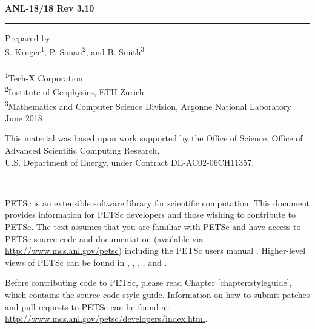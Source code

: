 \hfill {\large {\bf ANL-18/18 Rev 3.10}}

\vspace*{2in}
\vspace*{8pt}
\hrule
\vspace*{8pt}

\vspace*{0.5in}
\noindent Prepared by \\
{S. Kruger\textsuperscript{1}, P. Sanan\textsuperscript{2}, and B. Smith\textsuperscript{3}}\\
\\
\textsuperscript{1}Tech-X Corporation \\
\textsuperscript{2}Institute of Geophysics, ETH Zurich\\
\textsuperscript{3}Mathematics and Computer Science Division, Argonne National Laboratory \\

\vspace*{30pt}
\noindent June 2018

\vspace*{20pt}
\noindent This material was based upon work supported by the Office of Science, Office of Advanced Scientific Computing Research, \\
U.S. Department of Energy, under Contract DE-AC02-06CH11357.


\newpage

\hbox{ }

\vspace{1in}
\date{\today}

\pagestyle{empty}
\newpage

\medskip \medskip

%
%

\medskip \medskip
PETSc is an extensible software library for scientific
computation. This document provides information for PETSc
developers and those wishing to contribute to PETSc. The text assumes
that you are familiar with PETSc and have access to PETSc source code
and documentation (available
via \href{http://www.mcs.anl.gov/petsc}{http://www.mcs.anl.gov/petsc}) including the PETSc users manual \cite{petsc-user-ref}.
Higher-level views of PETSc can be found in \cite{s2011}, \cite{bgms00}, \cite{miss-paper}, \cite{bgms98}, and \cite{petsc-efficient}. 

Before contributing code to PETSc, please read Chapter \ref{chapter:styleguide}, which contains the source code style guide.
Information on how to submit patches and pull requests to PETSc can be found at
\href{http://www.mcs.anl.gov/petsc/developers/index.html}{http://www.mcs.anl.gov/petsc/developers/index.html}.


